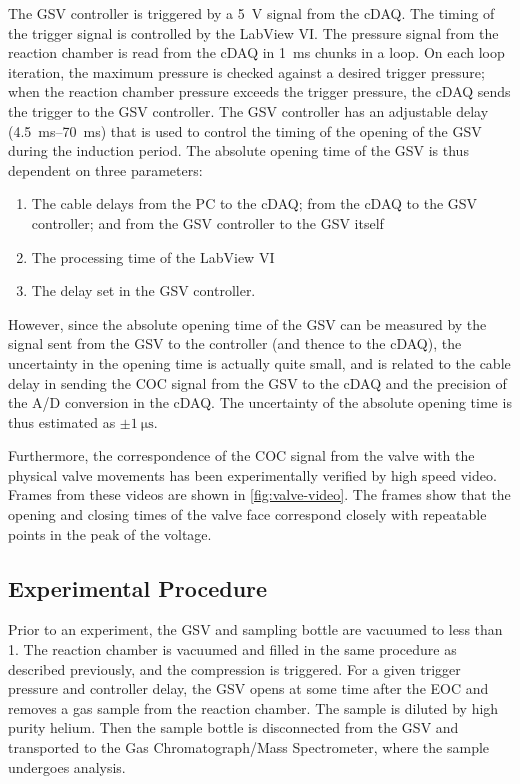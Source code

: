 \documentclass[../main.tex]{subfiles}
\begin{document}
The GSV controller is triggered by a \SI{5}{\volt} signal from the cDAQ.
The timing of the trigger signal is controlled by the LabView VI. The pressure
signal from the reaction chamber is read from the cDAQ in \SI{1}{\milli\second}
chunks in a loop. On each loop iteration, the maximum pressure is checked
against a desired trigger pressure; when the reaction chamber pressure exceeds
the trigger pressure, the cDAQ sends the trigger to the GSV controller. The
GSV controller has an adjustable delay (\SIrange{4.5}{70}{\milli\second}) that
is used to control the timing of the opening of the GSV during the induction period.
The absolute opening time of the GSV is thus dependent on three parameters:
\begin{enumerate}
\item The cable delays from the PC to the cDAQ; from the cDAQ to the GSV
      controller; and from the GSV controller to the GSV itself
\item The processing time of the LabView VI
\item The delay set in the GSV controller.
\end{enumerate}

However, since the absolute opening time of the GSV can be measured by
the signal sent from the GSV to the controller (and thence to the cDAQ),
the uncertainty in the opening time is actually quite small, and is related
to the cable delay in sending the COC signal from the GSV to the cDAQ and
the precision of the A/D conversion in the cDAQ. The uncertainty of the
absolute opening time is thus estimated as $\pm \SI{1}{\micro\second}$. 

Furthermore, the correspondence of the COC signal from the valve with
the physical valve movements has been experimentally verified by
high speed video. Frames from these videos are shown in \cref{fig:valve-video}.
The frames show that the opening and closing times of the valve face
correspond closely with repeatable points in the peak of the voltage.


\subsection{Experimental Procedure}

Prior to an experiment, the GSV and sampling bottle are vacuumed to less
than \SI{1}{\torr}. The reaction chamber is vacuumed and filled in the same
procedure as described previously, and the compression is triggered. For a given
trigger pressure and controller delay, the GSV opens at some time after the EOC
and removes a gas sample from the reaction chamber. The sample is diluted by
high purity helium. Then the sample bottle is disconnected from the GSV and transported
to the Gas Chromatograph/Mass Spectrometer, where the sample undergoes analysis.
\end{document}
